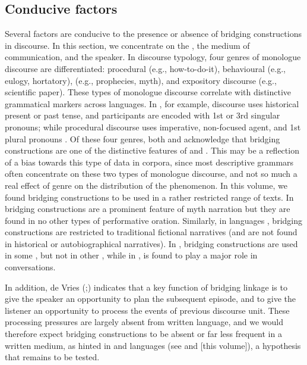 \documentclass[output=paper]{LSP/langsci}
\begin{document}
\subsection{Conducive factors} 
\label{GuAi41conducive}
Several factors are conducive to the presence or absence of bridging constructions in discourse. In this section, we concentrate on the , the medium of communication, and the speaker. 
In  discourse typology, four genres of monologue discourse are differentiated: procedural (e.g., how-to-do-it), behavioural (e.g., eulogy, hortatory),  (e.g., prophecies, myth), and expository discourse (e.g., scientific paper). These types of monologue discourse correlate with distinctive grammatical markers across languages. In , for example,  discourse uses historical present or past tense, and participants are encoded with 1st or 3rd singular pronouns; while procedural discourse uses imperative, non-focused agent, and 1st plural pronouns \citep[][3--17]{longacre83}. Of these four genres, both \citet[][9]{longacre83} and \citet[][365]{devries.2005} acknowledge that bridging constructions are one of the distinctive features of  and . This may be a reflection of a bias towards this type of data in corpora, since most descriptive grammars often concentrate on these two types of monologue discourse, and not so much a real effect of genre on the distribution of the phenomenon. In this volume, we found bridging constructions to be used in a rather restricted range of texts. In   bridging constructions are a prominent feature of myth narration but they are found in no other types of performative oration. Similarly, in  languages , bridging constructions are restricted to traditional fictional narratives (and are not found in historical or autobiographical narratives). In , bridging constructions are used in some , but not in other  , while in  ,  is found to play a major  role in conversations. 

In addition, de Vries (\citeyear[][378]{devries.2005};\citeyear[][817]{devries.2006}) indicates that a key function of bridging linkage is to give the speaker an opportunity to plan the subsequent  episode, and to give the listener an opportunity to process the events of previous discourse unit.  These processing pressures are largely absent from written language, and we would therefore expect bridging constructions to be absent or far less frequent in a written medium, as hinted in  and  languages (see \citealt{chapters/02Emlen} and \citealt{chapters/04Forker-Anker} [this volume]), a hypothesis that remains to be tested.
\end{document}
